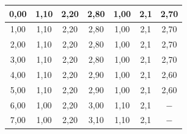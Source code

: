 \documentclass{article}
\begin{document}
\begin{table}[!ht]
\begin{tabular}{|c|c|c|c||c|c|c|}
0,00                                                                                                               & 1,10                           & 2,20                          & 2,80                            & 1,00                           & 2,1                           & 2,70                            \\ \hline
1,00                                                                                                               & 1,10                           & 2,20                          & 2,80                            & 1,00                           & 2,1                           & 2,70                            \\ \hline
2,00                                                                                                               & 1,10                           & 2,20                          & 2,80                            & 1,00                           & 2,1                           & 2,70                            \\ \hline
3,00                                                                                                               & 1,10                           & 2,20                          & 2,80                            & 1,00                           & 2,1                           & 2,70                            \\ \hline
4,00                                                                                                               & 1,10                           & 2,20                          & 2,90                            & 1,00                           & 2,1                           & 2,60                            \\ \hline
5,00                                                                                                               & 1,10                           & 2,20                          & 2,90                            & 1,00                           & 2,1                           & 2,60                            \\ \hline
6,00                                                                                                               & 1,00                           & 2,20                          & 3,00                            & 1,10                           & 2,1                           & $-$                             \\ \hline
7,00                                                                                                               & 1,00                           & 2,20                          & 3,10                            & 1,10                           & 2,1                           & $-$                             \\ \hline

\end{tabular}
\end{table}
\end{document}
